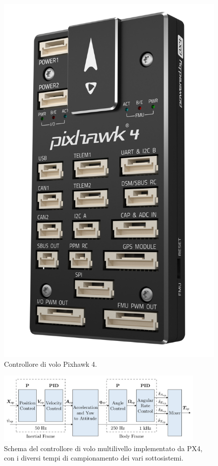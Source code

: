 \begin{figure}
    \centering
    \includegraphics[scale=0.1]{figs/chapter3/pixhawk4.jpg}
    \caption{Controllore di volo Pixhawk 4.}
    \label{fig:pixhawk}
\end{figure}

\begin{figure}
    \centering
    \includegraphics[width=0.9\textwidth]{figs/chapter3/px4-controller.jpg}
    \caption{Schema del controllore di volo multilivello implementato da PX4, con i diversi tempi di campionamento dei vari sottosistemi.}
    \label{fig:px4controller}
\end{figure}

